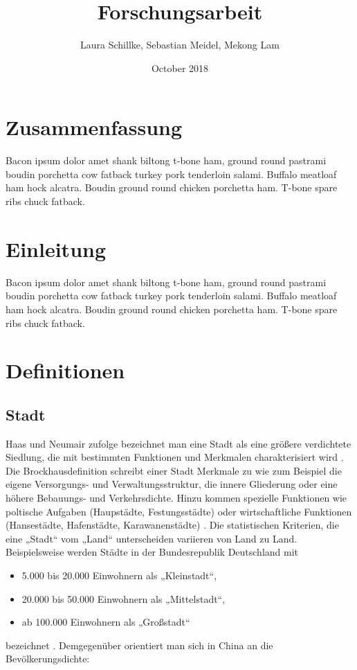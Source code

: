 \documentclass{article}
\title{Forschungsarbeit}
\author{Laura Schillke, Sebastian Meidel, Mekong Lam }
\date{October 2018}
\begin{document}
\maketitle


\newpage

\setcounter{tocdepth}{3}
\tableofcontents 



\newpage

\section{Zusammenfassung}
Bacon ipsum dolor amet shank biltong t-bone ham, ground round pastrami boudin porchetta cow fatback turkey pork tenderloin salami. Buffalo meatloaf ham hock alcatra. Boudin ground round chicken porchetta ham. T-bone spare ribs chuck fatback.

\section{Einleitung}
Bacon ipsum dolor amet shank biltong t-bone ham, ground round pastrami boudin porchetta cow fatback turkey pork tenderloin salami. Buffalo meatloaf ham hock alcatra. Boudin ground round chicken porchetta ham. T-bone spare ribs chuck fatback.


\section{Definitionen}

\subsection{Stadt}

Haas und Neumair zufolge bezeichnet man eine Stadt als eine größere verdichtete Siedlung, die mit bestimmten Funktionen und Merkmalen charakterisiert wird \cite{HaasDefinitionWirtschaftslexikon}. Die Brockhausdefinition schreibt einer Stadt Merkmale zu wie zum Beispiel die eigene Versorgungs- und Verwaltungsstruktur, die innere Gliederung oder eine höhere Bebauungs- und Verkehrsdichte. Hinzu kommen spezielle Funktionen wie poltische Aufgaben (Haupstädte, Festungsstädte) oder wirtschaftliche Funktionen (Hansestädte, Hafenstädte, Karawanenstädte) \cite{BrockhausStadt}. Die statistischen Kriterien, die eine „Stadt“ vom „Land“ unterscheiden variieren von Land zu Land. Beispielsweise werden Städte in der Bundesrepublik Deutschland mit 
\begin{itemize}
\item 5.000 bis 20.000 Einwohnern als „Kleinstadt“,
\item 20.000 bis 50.000 Einwohnern als „Mittelstadt“,
\item ab 100.000 Einwohnern als „Großstadt“ 
\end{itemize}
bezeichnet \cite{Institutinternationaldestatistique1887BulletinStatistique}. Demgegenüber orientiert man sich in China an die Bevölkerungsdichte: 
\end{document}
